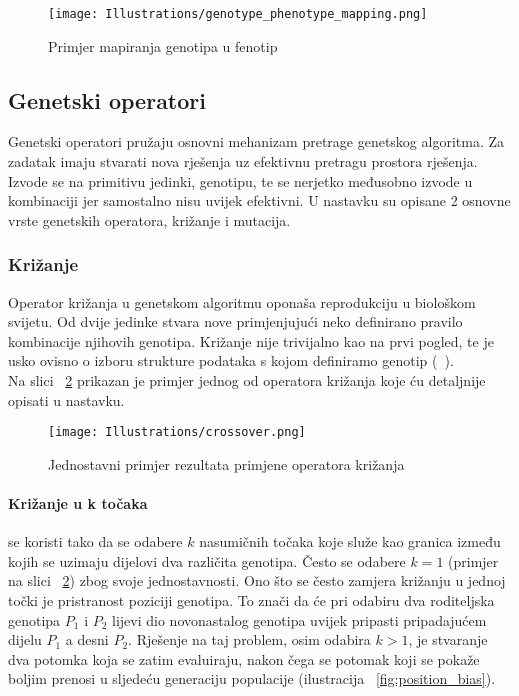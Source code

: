 \begin{figure}
	\texttt{[image: Illustrations/genotype\_phenotype\_mapping.png]}
	\caption{Primjer mapiranja genotipa u fenotip}
	\label{fig:genotype_phenotype_map}
\end{figure}

\subsection{Genetski operatori}
Genetski operatori pružaju osnovni mehanizam pretrage genetskog algoritma.
Za zadatak imaju stvarati nova rješenja uz efektivnu pretragu prostora rješenja.
Izvode se na primitivu jedinki, genotipu, te se nerjetko međusobno izvode u kombinaciji jer samostalno nisu uvijek efektivni.
U nastavku su opisane 2 osnovne vrste genetskih operatora, križanje i mutacija.

\subsubsection{Križanje}
Operator križanja u genetskom algoritmu oponaša reprodukciju u biološkom svijetu.
Od dvije jedinke stvara nove primjenjujući neko definirano pravilo kombinacije njihovih genotipa.
Križanje nije trivijalno kao na prvi pogled, te je usko ovisno o izboru strukture podataka s kojom definiramo genotip (~\cite{wong2015evolutionary}). \\
Na slici ~\ref{fig:crossover} prikazan je primjer jednog od operatora križanja koje ću detaljnije opisati u nastavku.

\begin{figure}
	\texttt{[image: Illustrations/crossover.png]}
	\caption{Jednostavni primjer rezultata primjene operatora križanja}
	\label{fig:crossover}
\end{figure}

\paragraph{Križanje u k točaka}
se koristi tako da se odabere $k$ nasumičnih točaka koje služe kao granica između kojih se uzimaju dijelovi dva različita genotipa.
Često se odabere $k = 1$ (primjer na slici ~\ref{fig:crossover}) zbog svoje jednostavnosti.
Ono što se često zamjera križanju u jednoj točki je pristranost poziciji genotipa.
To znači da će pri odabiru dva roditeljska genotipa $P_1$ i $P_2$ lijevi dio novonastalog genotipa uvijek pripasti pripadajućem dijelu $P_1$ a desni $P_2$.
Rješenje na taj problem, osim odabira $k > 1$, je stvaranje dva potomka koja se zatim evaluiraju, nakon čega se potomak koji se pokaže boljim prenosi u sljedeću generaciju populacije (ilustracija ~\ref{fig:position_bias}).


